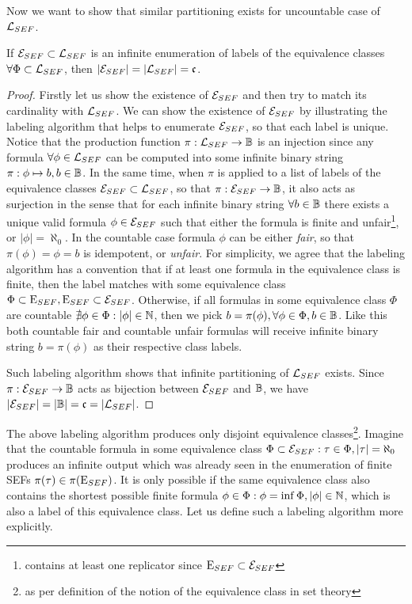 Now we want to show that similar partitioning exists for uncountable case of $\mathcal{L}_{SEF}$.

\begin{theorem}\label{th_sef_eqcls_cont_car}
  If $\mathcal{E}_{SEF} \subset \mathcal{L}_{SEF}$ is an infinite enumeration of labels of the equivalence classes $\forall \Phi \subset \mathcal{L}_{SEF}$, then $|\mathcal{E}_{SEF}| = | \mathcal{L}_{SEF}| = \mathfrak{c}$.
\end{theorem}
\begin{proof}
  Firstly let us show the existence of $\mathcal{E}_{SEF}$ and then try to match its cardinality with $\mathcal{L}_{SEF}$.
  We can show the existence of $\mathcal{E}_{SEF}$ by illustrating the labeling algorithm that helps to enumerate $\mathcal{E}_{SEF}$, so that each label is unique. Notice that the production function $\pi: \mathcal{L}_{SEF} \to \mathbb{B}$ is an injection since any formula $\forall \phi \in \mathcal{L}_{SEF}$ can be computed into some infinite binary string $\pi: \phi \mapsto b, b \in \mathbb{B}$. In the same time, when $\pi$ is applied to a list of labels of the equivalence classes $\mathcal{E}_{SEF} \subset \mathcal{L}_{SEF}$, so that $\pi: \mathcal{E}_{SEF} \to \mathbb{B}$, it also acts as surjection in the sense that for each infinite binary string $\forall b \in \mathbb{B}$ there exists a unique valid formula $\phi \in \mathcal{E}_{SEF}$ such that either the formula is finite and unfair\footnote{contains at least one replicator since $\mathrm{E}_{SEF} \subset \mathcal{E}_{SEF}$}, or $|\phi| = \aleph_0$. In the countable case formula $\phi$ can be either \textit{fair}, so that $\pi(\phi) = \phi = b$ is idempotent, or \textit{unfair}. For simplicity, we agree that the labeling algorithm has a convention that if at least one formula in the equivalence class is finite, then the label matches with some equivalence class $\Phi \subset \mathrm{E}_{SEF}, \mathrm{E}_{SEF} \subset \mathcal{E}_{SEF}$. Otherwise, if all formulas in some equivalence class $\Phi$ are countable $\nexists \phi \in \Phi : |\phi| \in \mathbb{N} $, then we pick $b = \pi(\phi), \forall \phi \in \Phi, b \in \mathbb{B}$. Like this both countable fair and countable unfair formulas will receive infinite binary string $b = \pi(\phi)$ as their respective class labels.

  Such labeling algorithm shows that infinite partitioning of $\mathcal{L}_{SEF}$ exists.
  Since $\pi: \mathcal{E}_{SEF} \to \mathbb{B}$ acts as bijection between $\mathcal{E}_{SEF}$ and $\mathbb{B}$, we have $|\mathcal{E}_{SEF}| = |\mathbb{B}| = \mathfrak{c} =|\mathcal{L}_{SEF}|$.
\end{proof}

The above labeling algorithm produces only disjoint equivalence classes\footnote{as per definition of the notion of the equivalence class in set theory}. Imagine that the countable formula in some equivalence class $\Phi \subset \mathcal{E}_{SEF}: \tau \in \Phi, |\tau| = \aleph_0$ produces an infinite output which was already seen in the enumeration of finite SEFs $\pi(\tau) \in \pi(\mathrm{E}_{SEF})$. It is only possible if the same equivalence class also contains the shortest possible finite formula $\phi \in \Phi: \phi = \inf \Phi, |\phi| \in \mathbb{N}$, which is also a label of this equivalence class. Let us define such a labeling algorithm more explicitly.

